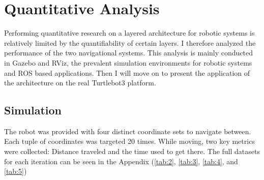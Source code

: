 \documentclass[]{article}
\begin{document}
	\section{Quantitative Analysis} 
	Performing quantitative research on a layered architecture for robotic systems is relatively limited by the quantifiability of certain layers. I therefore analyzed the performance of the two navigational systems. This analysis is mainly conducted in Gazebo and RViz, the prevalent simulation environments for robotic systems and ROS based applications. Then I will move on to present the application of the architecture on the real Turtlebot3 platform. 
	\subsection{Simulation}
	The robot was provided with four distinct coordinate sets to navigate between. Each tuple of coordinates was targeted 20 times. While moving, two key metrics were collected: Distance traveled and the time used to get there. The full datasets for each iteration can be seen in the Appendix (\ref{tab:2}, \ref{tab:3}, \ref{tab:4}, and \ref{tab:5})
	
\end{document}
